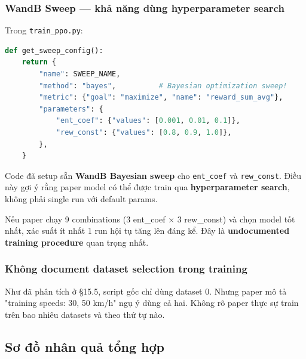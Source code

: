 \documentclass[11pt]{article}
\begin{document}
\subsubsection{WandB Sweep --- khả năng dùng hyperparameter search}

Trong \texttt{train\_ppo.py}:
\begin{lstlisting}[language=Python]
def get_sweep_config():
    return {
        "name": SWEEP_NAME,
        "method": "bayes",          # Bayesian optimization sweep!
        "metric": {"goal": "maximize", "name": "reward_sum_avg"},
        "parameters": {
            "ent_coef": {"values": [0.001, 0.01, 0.1]},
            "rew_const": {"values": [0.8, 0.9, 1.0]},
        },
    }
\end{lstlisting}

Code đã setup sẵn \textbf{WandB Bayesian sweep} cho \texttt{ent\_coef} và \texttt{rew\_const}. Điều này gợi ý rằng paper model có thể được train qua \textbf{hyperparameter search}, không phải single run với default params.

Nếu paper chạy 9 combinations ($3$ ent\_coef $\times$ $3$ rew\_const) và chọn model tốt nhất, xác suất ít nhất 1 run hội tụ tăng lên đáng kể. Đây là \textbf{undocumented training procedure} quan trọng nhất.

\subsubsection{Không document dataset selection trong training}

Như đã phân tích ở \S15.5, script gốc chỉ dùng dataset 0. Nhưng paper mô tả "training speeds: 30, 50 km/h" ngụ ý dùng cả hai. Không rõ paper thực sự train trên bao nhiêu datasets và theo thứ tự nào.

\subsection{Sơ đồ nhân quả tổng hợp}
\end{document}
